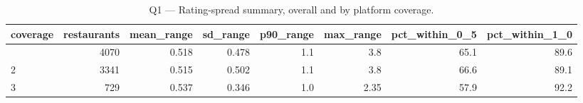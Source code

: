 \begin{table}[ht]
\centering
\caption{Q1 — Rating-spread summary, overall and by platform coverage.}
\label{tab:q1_consistency_summary}
{\tiny
\begin{tabular}{lrrrrrrr}
\toprule
coverage & restaurants & mean\_range & sd\_range & p90\_range & max\_range & pct\_within\_0\_5 & pct\_within\_1\_0 \\
\midrule
 & 4070 & 0.518 & 0.478 & 1.1 & 3.8 & 65.1 & 89.6 \\
2 & 3341 & 0.515 & 0.502 & 1.1 & 3.8 & 66.6 & 89.1 \\
3 & 729 & 0.537 & 0.346 & 1.0 & 2.35 & 57.9 & 92.2 \\
\bottomrule
\end{tabular}
}
\end{table}
